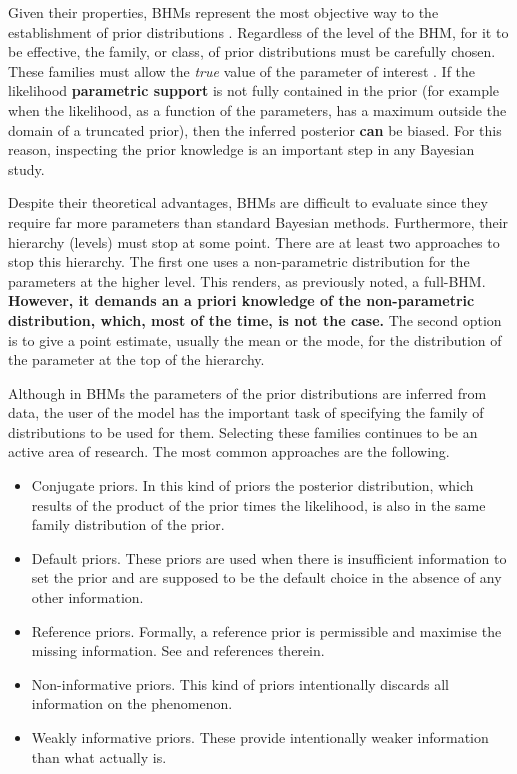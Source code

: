 Given their properties, BHMs represent the most objective way to the establishment of prior distributions \citep{Gelman2006}. Regardless of the level of the BHM, for it to be effective, the family, or class, of prior distributions must be carefully chosen. These families must allow the \emph{true} value of the parameter of interest \citep{Morris1983}. If the likelihood \textbf{parametric support} is not fully contained in the prior (for example when the likelihood, as a function of the parameters, has a maximum outside the domain of a truncated prior), then the inferred posterior \textbf{can} be biased. For this reason, inspecting the prior knowledge is an important step in any Bayesian study.

Despite their theoretical advantages, BHMs are difficult to evaluate since they require far more parameters than standard Bayesian methods.
Furthermore, their hierarchy (levels) must stop at some point. There are at least two approaches to stop this hierarchy. The first one uses a non-parametric distribution for the parameters at the higher level. This renders, as previously noted, a full-BHM. \textbf{However, it demands an a priori knowledge of the non-parametric distribution, which, most of the time, is not the case.} The second option is to give a point estimate, usually the mean or the mode, for the distribution of the parameter at the top of the hierarchy.  


Although in BHMs the parameters of the prior distributions are inferred from data, the user of the model has the important task of specifying the family of distributions to be used for them. Selecting these families continues to be an active area of research. The most common approaches are the following.

\begin{itemize}
\item Conjugate priors. In this kind of priors the posterior distribution, which results of the product of the prior times the likelihood, is also in the same family distribution of the prior. 

\item Default priors. These priors are used when there is insufficient information to set the prior and are supposed to be the default choice in the absence of any other information. 

\item Reference priors. Formally, a reference prior is permissible and maximise the missing information. See \citet{Berger2009} and references therein.

\item Non-informative priors. This kind of priors intentionally discards all information on the phenomenon.

\item Weakly informative priors. These provide intentionally weaker information than what actually is. 
\end{itemize}

